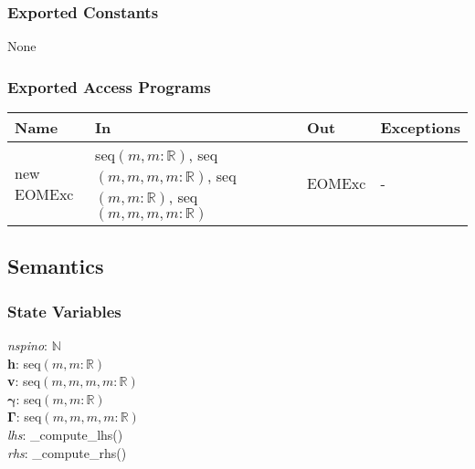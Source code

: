 \documentclass[12pt, titlepage]{article}
\begin{document}
\subsubsection{Exported Constants}
None

\subsubsection{Exported Access Programs}

\begin{center}
	\begin{tabular}{p{2.3cm} p{4cm} p{4cm} p{2cm}}
		\hline
		\textbf{Name} & \textbf{In} & \textbf{Out} & \textbf{Exceptions} \\
		\hline
		new EOMExc & seq$(m,m:\mathbb{R})$, seq$(m,m,m,m:\mathbb{R})$, 
		seq$(m,m:\mathbb{R})$, seq$(m,m,m,m:\mathbb{R})$& EOMExc & - \\
		\hline
	\end{tabular}
\end{center}

\subsection{Semantics}

\subsubsection{State Variables}
\textit{nspino}: $\mathbb{N}$\\
\textbf{h}: seq$(m,m:\mathbb{R})$\\
\textbf{v}: seq$(m,m,m,m:\mathbb{R})$\\
$\boldsymbol{\gamma}$: seq$(m,m:\mathbb{R})$\\
$\boldsymbol{\Gamma}$: seq$(m,m,m,m:\mathbb{R})$\\
\textit{lhs}: \_compute\_lhs()\\
\textit{rhs}: \_compute\_rhs()
\end{document}
